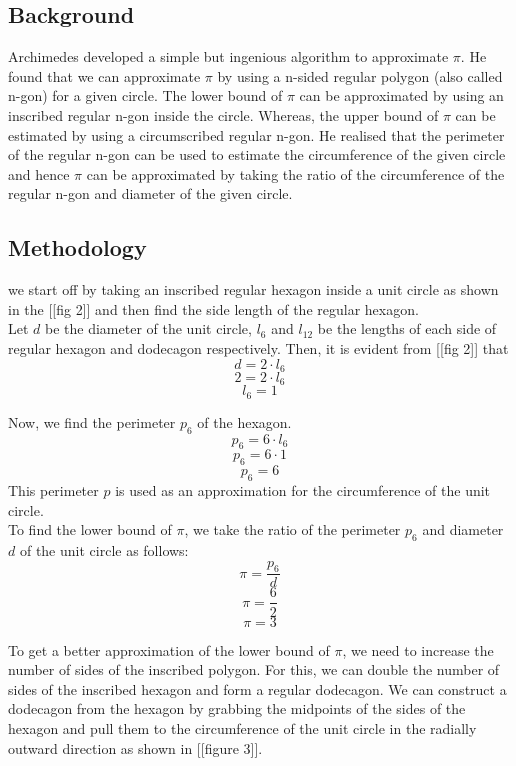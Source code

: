 \documentclass[12pt]{article}
\begin{document}
\subsection{Background}
Archimedes developed a simple but ingenious algorithm to approximate $\pi$. He found that we can approximate $\pi$ by using a n-sided regular polygon (also called n-gon) for a given circle. The lower bound of $\pi$ can be approximated by using an inscribed regular n-gon inside the circle. Whereas, the upper bound of $\pi$ can be estimated by using a circumscribed regular n-gon. He realised that the perimeter of the regular n-gon can be used to estimate the circumference of the given circle and hence $\pi$ can be approximated by taking the ratio of the circumference of the regular n-gon and diameter of the given circle.



\subsection{Methodology}
we start off by taking an inscribed regular hexagon inside a unit circle as shown in the [[fig 2]] and then find the side length of the regular hexagon. \\

Let $d$ be the diameter of the unit circle, $l_{6}$ and $l_{12}$ be the lengths of each side of regular hexagon and dodecagon respectively.
Then, it is evident from [[fig 2]] that\\
$$d = 2 \cdot l_{6}$$
$$2 = 2 \cdot l_{6}$$
$$l_{6} = 1$$


Now, we find the perimeter $p_{6}$ of the hexagon.\\
$$p_{6} = 6 \cdot l_{6}$$
$$p_{6} = 6 \cdot 1$$
$$p_{6} = 6$$
This perimeter $p$ is used as an approximation for the circumference of the unit circle.\\

To find the lower bound of $\pi$, we take the ratio of the perimeter $p_{6}$ and diameter $d$ of the unit circle as follows:\\
$$\pi = \frac{p_{6}}{d}$$
$$\pi = \frac{6}{2}$$
$$\pi = 3$$

To get a better approximation of the lower bound of $\pi$, we need to increase the number of sides of the inscribed polygon. For this, we can double the number of sides of the inscribed hexagon and form a regular dodecagon. We can construct a dodecagon from the hexagon by grabbing the midpoints of the sides of the hexagon and pull them to the circumference of the unit circle in the radially outward direction as shown in [[figure 3]]. \\
\end{document}
